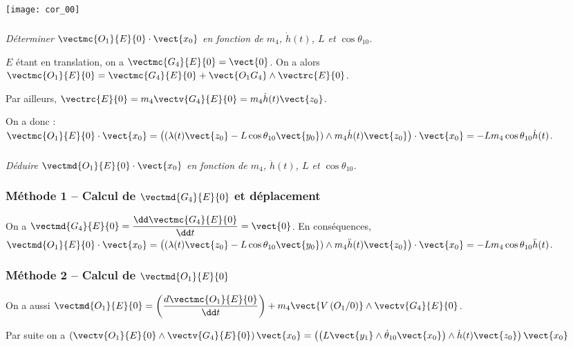 \begin{multicols}{2}
\begin{corrige}
\begin{center}
\texttt{[image: cor\_00]}
\end{center}
\end{corrige}
\else
\fi


\subparagraph{} \textit{Déterminer $\vectmc{O_1}{E}{0}\cdot \vect{x_0}$ en fonction de $m_4$, $\dot{h}(t)$, $L$ et $\cos\theta_{10}$.}

\ifprof
\begin{corrige}
$E$ étant en translation, on a $\vectmc{G_4}{E}{0}=\vect{0}$. On a alors 
 $\vectmc{O_1}{E}{0}=\vectmc{G_4}{E}{0}+\vect{O_1G_4}\wedge\vectrc{E}{0}$.

Par ailleurs, $\vectrc{E}{0}=m_4\vectv{G_4}{E}{0} = m_4\dot{h}(t)\vect{z_0}$. 

On a donc :
$ \vectmc{O_1}{E}{0}\cdot \vect{x_0} 
= \left(\left( \lambda(t)\vect{z_0}-L\cos\theta_{10}\vect{y_0}\right)\wedge m_4\dot{h}(t)\vect{z_0}\right) \cdot \vect{x_0}
=  -Lm_4\cos\theta_{10}\dot{h}(t)$.
 
 
\end{corrige}
\else
\fi




\subparagraph{} \textit{Déduire $\vectmd{O_1}{E}{0}\cdot \vect{x_0}$ en fonction de $m_4$, $\ddot{h}(t)$, $L$ et $\cos\theta_{10}$.}

\ifprof
\begin{corrige}
\subsubsection*{Méthode 1 -- Calcul de $\vectmd{G_4}{E}{0}$ et déplacement}
On a $\vectmd{G_4}{E}{0}= \dfrac{\dd \vectmc{G_4}{E}{0}}{\dd t}= \vect{0}$. En conséquences, 
$ \vectmd{O_1}{E}{0}\cdot \vect{x_0} 
= \left(\left( \lambda(t)\vect{z_0}-L\cos\theta_{10}\vect{y_0}\right)\wedge m_4\ddot{h}(t)\vect{z_0}\right) \cdot \vect{x_0} =  -Lm_4\cos\theta_{10}\ddot{h}(t)$.

\subsubsection*{Méthode 2 -- Calcul de $\vectmd{O_1}{E}{0}$}
On a aussi $\vectmd{O_1}{E}{0} = \left(\dfrac{d \vectmc{O_1}{E}{0}}{\dd t}\right)+m_4\vect{V\left(O_1/0\right)}\wedge\vectv{G_4}{E}{0} $. 

Par suite on a 
$\left(\vectv{O_1}{E}{0}\wedge\vectv{G_4}{E}{0}\right)\vect{x_0}=
\left(\left( L\vect{y_1}\wedge \dot{\theta}_{10} \vect{x_0} \right) \wedge\dot{h}(t)\vect{z_0}\right)\vect{x_0} $


\end{corrige}
\end{multicols}
